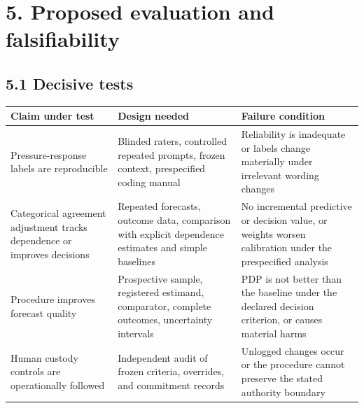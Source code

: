 \documentclass[
  english,
]{article}
\newcounter{none} %
\begin{document}
\section{5. Proposed evaluation and
falsifiability}\label{proposed-evaluation-and-falsifiability}

\subsection{5.1 Decisive tests}\label{decisive-tests}

{\def\LTcaptype{none} %
\begin{longtable}[]{@{}
  >{\raggedright\arraybackslash}p{}
  >{\raggedright\arraybackslash}p{}
  >{\raggedright\arraybackslash}p{}@{}}
\toprule\noalign{}
\begin{minipage}[b]{\linewidth}\raggedright
Claim under test
\end{minipage} & \begin{minipage}[b]{\linewidth}\raggedright
Design needed
\end{minipage} & \begin{minipage}[b]{\linewidth}\raggedright
Failure condition
\end{minipage} \\
\midrule\noalign{}
\endhead
\bottomrule\noalign{}
\endlastfoot
Pressure-response labels are reproducible & Blinded raters, controlled
repeated prompts, frozen context, prespecified coding manual &
Reliability is inadequate or labels change materially under irrelevant
wording changes \\
Categorical agreement adjustment tracks dependence or improves decisions
& Repeated forecasts, outcome data, comparison with explicit dependence
estimates and simple baselines & No incremental predictive or decision
value, or weights worsen calibration under the prespecified analysis \\
Procedure improves forecast quality & Prospective sample, registered
estimand, comparator, complete outcomes, uncertainty intervals & PDP is
not better than the baseline under the declared decision criterion, or
causes material harms \\
Human custody controls are operationally followed & Independent audit of
frozen criteria, overrides, and commitment records & Unlogged changes
occur or the procedure cannot preserve the stated authority boundary \\
\end{longtable}
}
\end{document}
